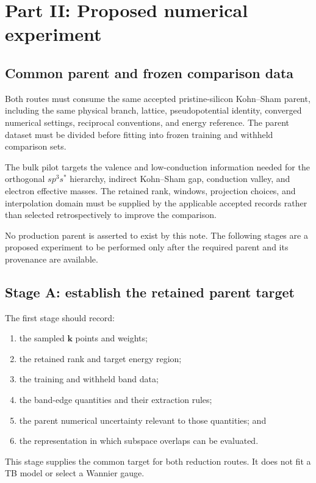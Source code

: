 \section*{Part II: Proposed numerical experiment}

\subsection*{Common parent and frozen comparison data}

Both routes must consume the same accepted pristine-silicon Kohn--Sham parent,
including the same physical branch, lattice, pseudopotential identity,
converged numerical settings, reciprocal conventions, and energy reference.
The parent dataset must be divided before fitting into frozen training and
withheld comparison sets.

The bulk pilot targets the valence and low-conduction information needed for
the orthogonal $sp^3s^{\ast}$ hierarchy, indirect Kohn--Sham gap, conduction
valley, and electron effective masses. The retained rank, windows, projection
choices, and interpolation domain must be supplied by the applicable accepted
records rather than selected retrospectively to improve the comparison.

No production parent is asserted to exist by this note. The following stages
are a proposed experiment to be performed only after the required parent and
its provenance are available.

\subsection*{Stage A: establish the retained parent target}

The first stage should record:
\begin{enumerate}
    \item the sampled $\mathbf k$ points and weights;
    \item the retained rank and target energy region;
    \item the training and withheld band data;
    \item the band-edge quantities and their extraction rules;
    \item the parent numerical uncertainty relevant to those quantities; and
    \item the representation in which subspace overlaps can be evaluated.
\end{enumerate}
This stage supplies the common target for both reduction routes. It does not
fit a TB model or select a Wannier gauge.

